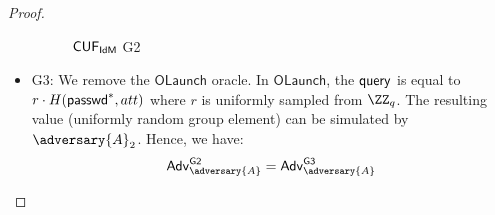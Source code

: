 \begin{proof}
\begin{itemize}
\begin{figure*}
{{\begin{pchstack}[center, space=0.2cm, boxed]
\begin{pcvstack}
    \end{pcvstack}
    \begin{pcvstack}
    \end{pcvstack}
    \end{pchstack}
}}
\caption{$\mathsf{CUF}_{\textsf{IdM}}$ \textsf{G2}}
\label{game:cuf_idmg2}
\end{figure*}

        \item \textsf{G3}: We remove the $\mathsf{OLaunch}$ oracle. In $\mathsf{OLaunch}$, the $\mathsf{query}$ is equal to $r\cdot H(\textsf{passwd}^*, att)$ where $r$ is uniformly sampled from $\ZZ_q$. The resulting value (uniformly random group element) can be simulated by $\adversary{A}_2$. Hence, we have:
        \begin{align*}
            \advtg_\adversary{A}^{\mathsf{G2}} = \advtg_\adversary{A}^{\mathsf{G3}} 
        \end{align*}


\end{itemize}
\end{proof}
